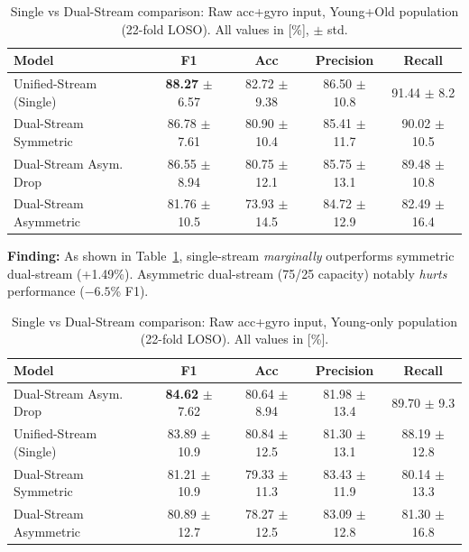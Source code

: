 \documentclass{article}
\begin{document}
\begin{table}[htbp]
    \centering
    \caption{Single vs Dual-Stream comparison: Raw acc+gyro input, Young+Old population (22-fold LOSO). All values in [\%], $\pm$ std.}
    \label{tab:rq1_raw}
    \begin{tabular}{lcccc}
        \toprule
        \textbf{Model} & \textbf{F1} & \textbf{Acc} & \textbf{Precision} & \textbf{Recall} \\
        \midrule
        Unified-Stream (Single) & \textbf{88.27} $\pm$ 6.57 & 82.72 $\pm$ 9.38 & 86.50 $\pm$ 10.8 & 91.44 $\pm$ 8.2 \\
        Dual-Stream Symmetric & 86.78 $\pm$ 7.61 & 80.90 $\pm$ 10.4 & 85.41 $\pm$ 11.7 & 90.02 $\pm$ 10.5 \\
        Dual-Stream Asym. Drop & 86.55 $\pm$ 8.94 & 80.75 $\pm$ 12.1 & 85.75 $\pm$ 13.1 & 89.48 $\pm$ 10.8 \\
        Dual-Stream Asymmetric & 81.76 $\pm$ 10.5 & 73.93 $\pm$ 14.5 & 84.72 $\pm$ 12.9 & 82.49 $\pm$ 16.4 \\
        \bottomrule
    \end{tabular}
\end{table}

\textbf{Finding:} As shown in Table~\ref{tab:rq1_raw}, single-stream \textit{marginally} outperforms symmetric dual-stream (+1.49\%). Asymmetric dual-stream (75/25 capacity) notably \textit{hurts} performance ($-6.5$\% F1).

\begin{table}[htbp]
    \centering
    \caption{Single vs Dual-Stream comparison: Raw acc+gyro input, Young-only population (22-fold LOSO). All values in [\%].}
    \label{tab:rq1_raw_young}
    \begin{tabular}{lcccc}
        \toprule
        \textbf{Model} & \textbf{F1} & \textbf{Acc} & \textbf{Precision} & \textbf{Recall} \\
        \midrule
        Dual-Stream Asym. Drop & \textbf{84.62} $\pm$ 7.62 & 80.64 $\pm$ 8.94 & 81.98 $\pm$ 13.4 & 89.70 $\pm$ 9.3 \\
        Unified-Stream (Single) & 83.89 $\pm$ 10.9 & 80.84 $\pm$ 12.5 & 81.30 $\pm$ 13.1 & 88.19 $\pm$ 12.8 \\
        Dual-Stream Symmetric & 81.21 $\pm$ 10.9 & 79.33 $\pm$ 11.3 & 83.43 $\pm$ 11.9 & 80.14 $\pm$ 13.3 \\
        Dual-Stream Asymmetric & 80.89 $\pm$ 12.7 & 78.27 $\pm$ 12.5 & 83.09 $\pm$ 12.8 & 81.30 $\pm$ 16.8 \\
        \bottomrule
    \end{tabular}
\end{table}
\end{document}
